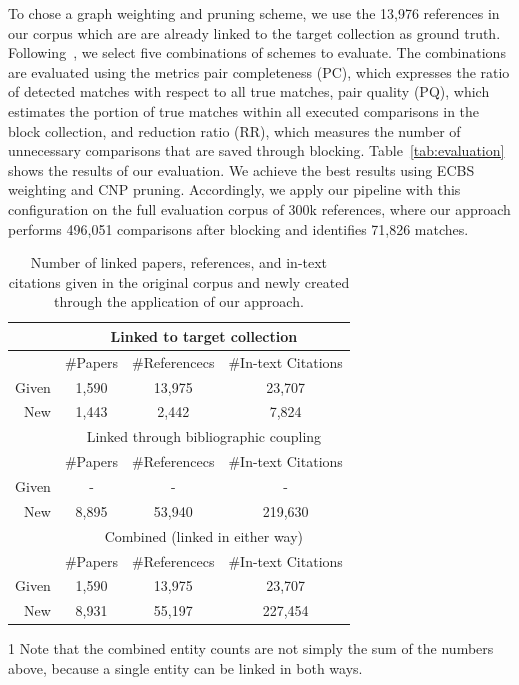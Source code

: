 To chose a graph weighting and pruning scheme, we use the 13,976 references in our corpus which are are already linked to the target collection as ground truth. Following~\cite{Papadakis2014}, we select five combinations of schemes to evaluate. The combinations are evaluated using the metrics pair completeness (PC), which expresses the ratio of detected matches with respect to all true matches, pair quality (PQ), which estimates the portion of true matches within all executed comparisons in the block collection, and reduction ratio (RR), which measures the number of unnecessary comparisons that are saved through blocking. Table~\ref{tab:evaluation} shows the results of our evaluation. We achieve the best results using ECBS weighting and CNP pruning. Accordingly, we apply our pipeline with this configuration on the full evaluation corpus of 300k references, where our approach performs 496,051 comparisons after blocking and identifies 71,826 matches.

\begin{table}
   \centering
   \caption{Number of linked papers, references, and in-text citations given in the original corpus and newly created through the application of our approach.}
   \label{tab:newlinks}
   \begin{small}
   \begin{threeparttable}
   \begin{tabular}{rccc}
     \toprule
     \ & \multicolumn{3}{c}{Linked to target collection} \\
     \midrule
     \ & \#Papers & \#Referencecs & \#In-text Citations \\
     Given & 1,590 & 13,975 & 23,707 \\
     New & 1,443 & 2,442 & 7,824 \\
     \midrule
     \ & \multicolumn{3}{c}{Linked through bibliographic coupling} \\
     \midrule
     \ & \#Papers & \#Referencecs & \#In-text Citations \\
     Given & - & - & - \\
     New & 8,895 & 53,940 & 219,630 \\
     \midrule
     \ & \multicolumn{3}{c}{Combined (linked in either way)\tnote{1}} \\
     \midrule
     \ & \#Papers & \#Referencecs & \#In-text Citations \\
     Given & 1,590 & 13,975 & 23,707 \\
     New & 8,931 & 55,197 & 227,454 \\
   \bottomrule
 \end{tabular}
    \begin{footnotesize}
    \begin{tablenotes}
      \item[1] Note that the combined entity counts are not simply the sum of the numbers above, because a single entity can be linked in both ways.
  \end{tablenotes}
   \end{footnotesize}
  \end{threeparttable}
  \end{small}
\end{table}

